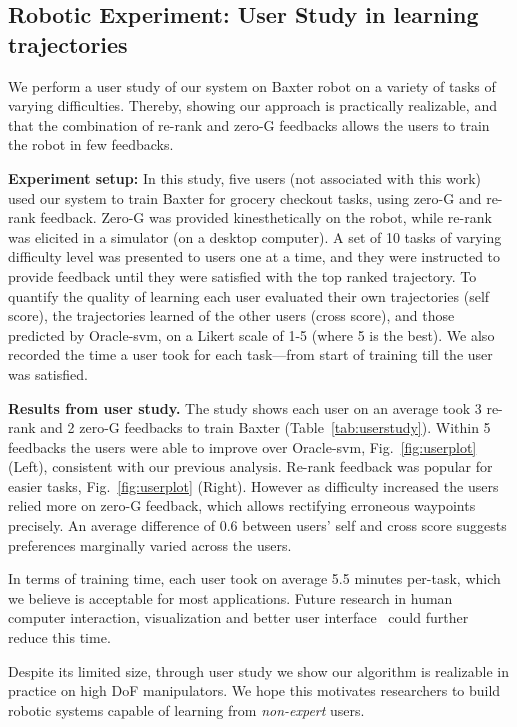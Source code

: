 \subsection{Robotic Experiment: User Study in learning trajectories}

\label{sec:user-study}
 We perform a user study of our system on Baxter robot on a variety of tasks of varying difficulties. Thereby, showing our approach is practically realizable, and that the combination of re-rank and zero-G feedbacks allows the users to train the robot in few feedbacks. 

\textbf{Experiment setup:} In this study, five  users (not associated with this work) used our system to train Baxter for grocery checkout tasks, using zero-G and re-rank feedback. Zero-G was provided kinesthetically on the robot, while re-rank was elicited in a simulator (on a desktop computer). A set of 10 tasks of varying difficulty level was presented to users one at a time, and they were instructed to provide feedback until they were satisfied with the top ranked trajectory. To quantify the quality of learning each user evaluated their own trajectories (self score), the trajectories learned of the other users (cross score), and those predicted by Oracle-svm, on a Likert scale of 1-5 (where 5 is the best). We also recorded the time a user took for each task---from start of training till the user was satisfied.

\textbf{Results from user study.} The study shows each user on an average took 3 re-rank and 2 zero-G feedbacks to train Baxter (Table~\ref{tab:userstudy}). 
Within 5 feedbacks the users were able to improve over Oracle-svm, Fig.~\ref{fig:userplot} (Left), consistent with our previous analysis. Re-rank feedback was  popular for easier tasks, 
Fig.~\ref{fig:userplot} (Right). However as difficulty increased the users relied more on zero-G feedback, which allows  rectifying erroneous waypoints precisely. An average difference of 0.6 between users' self and cross score suggests preferences marginally varied across the users. 

In terms of training time, each user took on average 5.5 minutes per-task, which we believe is acceptable for most applications. Future research in human computer interaction, visualization and better user interface~\citep{Shneiderman03} could further reduce this time.

Despite its limited size, through user study we show our algorithm is realizable in practice on high DoF manipulators. We hope this motivates researchers to build robotic systems capable of learning from \textit{non-expert} users.

